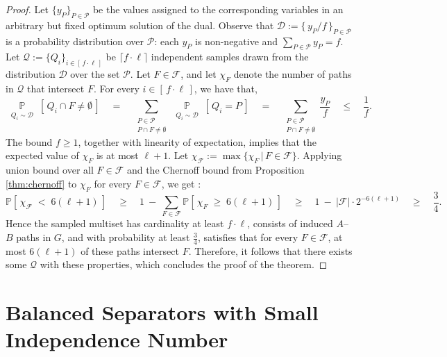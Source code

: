 \documentclass[11pt]{amsart}
\begin{document}
\begin{proof}
    Let $\{y_P\}_{P\in\mathcal{P}}$ be the values assigned to the corresponding variables in an arbitrary but fixed optimum solution of the dual. Observe that $\mathcal{D} := \{\,y_P/f\,\}_{P\in\mathcal{P}}$ is a probability distribution over $\mathcal{P}$: each $y_P$ is non-negative and $\sum_{P\in\mathcal{P}}y_P = f$. Let $\mathcal{Q} := \{Q_i\}_{i\in[\,f \cdot \ell\,]}$ be $\lceil f \cdot \ell \rceil$ independent samples drawn from the distribution $\mathcal{D}$ over the set $\mathcal{P}$. Let $F \in \mathcal{F}$, and let $\chi_F$ denote the number of paths in $\mathcal{Q}$ that intersect $F$. For every $i\in[\,f \cdot \ell\,]$, we have that,
    $$
    \displaystyle \mathop{\mathbb{P}}\limits_{\substack{Q_i\sim\mathcal{D}}}\left[\,Q_i \cap F \neq \emptyset\,\right] \quad
    = \quad \sum_{\substack{P\in\mathcal{P}\\ P\cap F\neq \emptyset}}
    \displaystyle \mathop{\mathbb{P}}\limits_{\substack{Q_i\sim\mathcal{D}}}\left[\, Q_i = P\, \right] \quad
    = \quad \sum_{\substack{P\in\mathcal{P}\\ P\cap F\neq \emptyset}} \frac{y_{P}}{f} \quad
    \leq \quad \frac{1}{f}.
    $$
    The bound $f \geq 1$, together with linearity of expectation, implies that the expected value of $\chi_F$ is at most $\ell + 1$. Let $\chi_{\mathcal{F}} := \max\{\chi_F\, |\, F\in\mathcal{F}\}$. Applying union bound over all $F\in\mathcal{F}$ and the Chernoff bound from Proposition \ref{thm:chernoff} to $\chi_F$ for every $F\in\mathcal{F}$, we get :
    $$
    \mathbb{P}\left[\,\chi_{\mathcal{F}}\; <\; 6(\ell+1)\,\right] \quad
    \geq \quad 1\ -\ \sum_{F\in\mathcal{F}}\mathbb{P}\left[\,\chi_F\; \geq\; 6(\ell+1)\,\right] \quad
    \geq \quad 1\ -\ |\mathcal{F}| \cdot 2^{-6(\ell+1)} \quad
    \geq \quad \frac{3}{4}.
    $$
    Hence the sampled multiset has cardinality at least $f \cdot \ell$, consists of induced $A$--$B$ paths in $G$, and with probability at least $\frac{3}{4}$, satisfies that for every $F \in \mathcal{F}$, at most $6(\ell+1)$ of these paths intersect $F$. Therefore, it follows that there  exists some $\mathcal{Q}$ with these properties, which concludes the proof of the theorem. 
\end{proof}

\section{Balanced Separators with Small Independence Number}\label{sec:balanced_separator}
\end{document}
